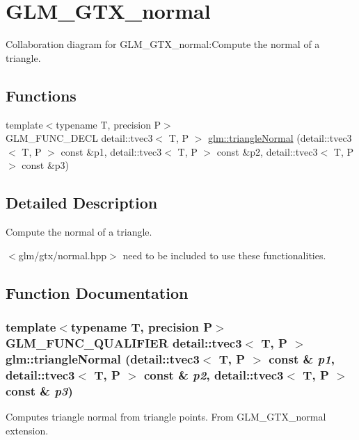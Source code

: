 \hypertarget{group__gtx__normal}{
\section{GLM\_\-GTX\_\-normal}
\label{group__gtx__normal}
}


Collaboration diagram for GLM\_\-GTX\_\-normal:Compute the normal of a triangle.  
\subsection*{Functions}
\begin{CompactItemize}
\item 
{\footnotesize template$<$typename T, precision P$>$ }\\GLM\_\-FUNC\_\-DECL detail::tvec3$<$ T, P $>$ \hyperlink{group__gtx__normal_g008775be02f71e8673a58e34acbb9a69}{glm::triangleNormal} (detail::tvec3$<$ T, P $>$ const \&p1, detail::tvec3$<$ T, P $>$ const \&p2, detail::tvec3$<$ T, P $>$ const \&p3)
\end{CompactItemize}


\subsection{Detailed Description}
Compute the normal of a triangle. 

$<$glm/gtx/normal.hpp$>$ need to be included to use these functionalities. 

\subsection{Function Documentation}
\hypertarget{group__gtx__normal_g008775be02f71e8673a58e34acbb9a69}{
\subsubsection[triangleNormal]{\setlength{\rightskip}{0pt plus 5cm}template$<$typename T, precision P$>$ GLM\_\-FUNC\_\-QUALIFIER detail::tvec3$<$ T, P $>$ glm::triangleNormal (detail::tvec3$<$ T, P $>$ const \& {\em p1}, \/  detail::tvec3$<$ T, P $>$ const \& {\em p2}, \/  detail::tvec3$<$ T, P $>$ const \& {\em p3})}}
\label{group__gtx__normal_g008775be02f71e8673a58e34acbb9a69}


Computes triangle normal from triangle points. From GLM\_\-GTX\_\-normal extension. 